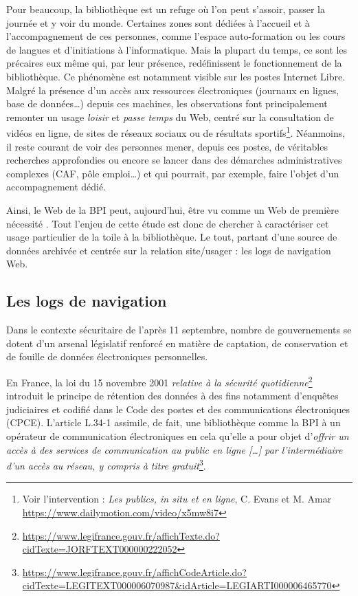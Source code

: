 \documentclass[symmetric,justified,marginals=raggedouter]{tufte-book}
\begin{document}
\noindent Pour beaucoup, la bibliothèque est un refuge où l'on peut s'assoir, passer la journée et y voir du monde. Certaines zones sont dédiées à l'accueil et à l'accompagnement de ces personnes, comme l'espace auto-formation ou les cours de langues et d'initiations à l'informatique. Mais la plupart du temps, ce sont les précaires eux même qui, par leur présence, redéfinissent le fonctionnement de la bibliothèque. Ce phénomène est notamment visible sur les postes Internet Libre. Malgré la présence d'un accès aux ressources électroniques (journaux en lignes, base de données\ldots{}) depuis ces machines, les observations font principalement remonter un usage \textit{loisir} et \textit{passe temps} du Web, centré sur la consultation de vidéos en ligne, de sites de réseaux sociaux ou de résultats sportifs\footnote{\RaggedOuter Voir l'intervention : \textit{Les publics, in situ et en ligne}, C. Evans et M. Amar  \url{https://www.dailymotion.com/video/x5mw8i7}}. Néanmoins, il reste courant de voir des personnes mener, depuis ces postes, de véritables recherches approfondies ou encore se lancer dans des démarches administratives complexes (CAF, pôle emploi\ldots{}) et qui pourrait, par exemple, faire l'objet d'un accompagnement dédié. 

Ainsi, le Web de la BPI peut, aujourd'hui, être vu comme un Web de première nécessité \citep{pasquier_classes_2018}. Tout l'enjeu de cette étude est donc de chercher à caractériser cet usage particulier de la toile à la bibliothèque. Le tout, partant d'une source de données archivée et centrée sur la relation site/usager : les logs de navigation Web. 

\subsection{Les logs de navigation}

\noindent Dans le contexte sécuritaire de l'après 11 septembre, nombre de gouvernements se dotent d'un arsenal législatif renforcé en matière de captation, de conservation et de fouille de données électroniques personnelles. 

En France, la loi du 15 novembre 2001 \textit{relative à la sécurité quotidienne}\footnote{\RaggedOuter \url{https://www.legifrance.gouv.fr/affichTexte.do?cidTexte=JORFTEXT000000222052}} introduit le principe de rétention des données à des fins notamment d'enquêtes judiciaires et codifié dans le Code des postes et des communications électroniques (CPCE). L'article L.34-1 assimile, de fait, une bibliothèque comme la BPI à un opérateur de communication électroniques en cela qu'elle a pour objet d'\og\textit{offrir un accès à des services de communication au public en ligne [\ldots{}] par l'intermédiaire d'un accès au réseau, y compris à titre gratuit}\fg{}\footnote{\RaggedOuter \url{https://www.legifrance.gouv.fr/affichCodeArticle.do?cidTexte=LEGITEXT000006070987\&idArticle=LEGIARTI000006465770}}. 
\end{document}
